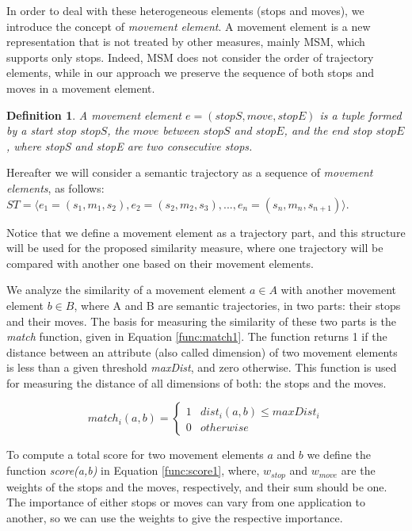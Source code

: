 \documentclass[12pt]{article}
\newtheorem{definition}{Definition}
\begin{document}
In order to deal with these heterogeneous elements (stops and moves), we introduce the concept of \emph{movement element}. A movement element is a new representation that is not treated by other measures, mainly MSM, which supports only stops. Indeed, MSM does not consider the order of trajectory elements, while in our approach we preserve the sequence of both stops and moves in a movement element.

\begin{definition}
\label{def:movement_element}
A movement element  $e=(stopS, move, stopE)$ is a tuple formed by a start stop $stopS$, the $move$ between $stopS$ and  $stopE$, and the end stop $stopE$, where stopS and stopE are two consecutive stops.
\end{definition}


Hereafter we will consider a semantic trajectory as a sequence of \textit{movement elements}, as follows: 
$ST=\langle e_1=(s_1,m_1,s_2), e_2=(s_2,m_2,s_3), ..., e_n=(s_n,m_n,s_{n+1}) \rangle$.

Notice that we define a movement element as a trajectory part, and this structure will be used for the proposed similarity measure, where one trajectory will be compared with another one based on their movement elements.



We analyze the similarity of a movement element $a\in A$ with another movement element $b\in B$, where A and B are semantic trajectories, in two parts: their stops and their moves. The basis for measuring the similarity of these two parts is the \emph{match} function, given in Equation \ref{func:match1}. The function returns 1 if the distance between an attribute (also called dimension) of two movement elements is less than a given threshold \emph{maxDist}, and zero otherwise. This function is used for measuring the distance of all dimensions of both: the stops and the moves.

\begin{equation}
\label{func:match1}
  match_i(a, b) = 
  \begin{cases} 
      1 & dist_i(a, b) \leq maxDist_i \\
      0 & otherwise
  \end{cases}
\end{equation}

To compute a total score for two movement elements $a$ and $b$ we define the function \emph{score(a,b)} in Equation \ref{func:score1}, where, $w_{stop}$ and $w_{move}$ are the weights of the stops and the moves, respectively, and their sum should be one. The importance of either stops or moves can vary from one application to another, so we can use the weights to give the respective importance. 
\end{document}
